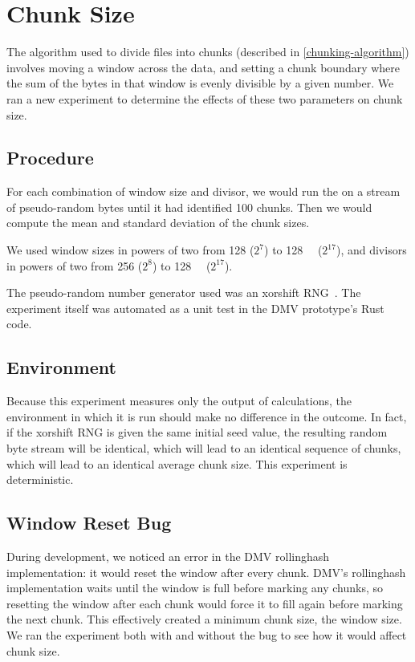 \tweak{\clearpage}
\section{Chunk Size}\label{rolling-hash-exp}

The algorithm used to divide files into chunks (described in
\autoref{chunking-algorithm}) involves moving a window across the data, and
setting a chunk boundary where the sum of the bytes in that window is evenly
divisible by a given number. We ran a new experiment to determine the effects of
these two parameters on chunk size.

\subsection{Procedure}

For each combination of window size and divisor, we would run the
 on a stream of pseudo-random bytes until it had
identified \num{100} chunks. Then we would compute the mean and standard
deviation of the chunk sizes.

We used window sizes in powers of two from \SI{128}{\byte} ($2^7$) to
\SI{128}{\kibi\byte} ($2^{17}$), and divisors in powers of two from \num{256}
($2^8$) to \SI{128}{\kibi\relax} ($2^{17}$).

The pseudo-random number generator used was an xorshift
\gls{RNG}~\cite{xorshift_rng}. The experiment itself was automated as a unit
test in the \gls{DMV} prototype's Rust code.

\subsection{Environment}

Because this experiment measures only the output of calculations, the
environment in which it is run should make no difference in the outcome. In
fact, if the xorshift RNG is given the same initial seed value, the resulting
random byte stream will be identical, which will lead to an identical sequence
of chunks, which will lead to an identical average chunk size. This experiment
is deterministic.

\subsection{Window Reset Bug}

During development, we noticed an error in the DMV \gls{rollinghash}
implementation: it would reset the window after every chunk. DMV's
\gls{rollinghash} implementation waits until the window is full before marking
any chunks, so resetting the window after each chunk would force it to fill
again before marking the next chunk. This effectively created a minimum chunk
size, the window size. We ran the experiment both with and without the bug to
see how it would affect chunk size.

